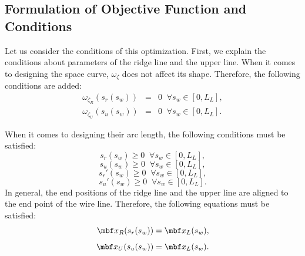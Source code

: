\documentclass[E]{scitrans}
\begin{document}
\subsection*{Formulation of Objective Function and Conditions}
Let us consider the conditions of this optimization. First, we explain the conditions about parameters of the ridge line and the upper line. When it comes to designing the space curve, $ \omega_{\zeta} $ does not affect its shape. Therefore, the following conditions are added:
\begin{eqnarray}\label{eq:conds_omgZt}
\omega_{\zeta_R}(s_r(s_w)) &=& 0 \;\; \forall s_w\in[0,L_L], \\
\omega_{\zeta_U}(s_u(s_w)) &=& 0 \;\; \forall s_w\in[0,L_L]. 
\end{eqnarray}

When it comes to designing their arc length, the following  conditions  must be satisfied:
\begin{equation}\label{eq:conds_arc1}
	s_r(s_w) \geq 0 \;\; \forall s_w\in[0,L_L], 
\end{equation}
\begin{equation}\label{eq:conds_arc2}
	s_u(s_w) \geq 0 \;\; \forall s_w\in[0,L_L], 
\end{equation}
\begin{equation}\label{eq:conds_arc3}
	s_r'(s_w) \geq 0 \;\; \forall s_w\in[0,L_L], 
\end{equation}
\begin{equation}\label{eq:conds_arc4}
	s_u'(s_w) \geq 0 \;\; \forall s_w\in[0,L_L].
\end{equation}
In general, the end positions of the ridge line and the upper line are aligned to the end point of the wire line. Therefore, the following equations must be satisfied:
\begin{equation}\label{eq:conds_endp1}
	\mbold{x}_R (s_r(s_w)) = \mbold{x}_L(s_w), 
\end{equation}
\begin{equation}\label{eq:conds_endp2}
	\mbold{x}_U (s_u(s_w)) = \mbold{x}_L(s_w).
\end{equation}
\end{document}
